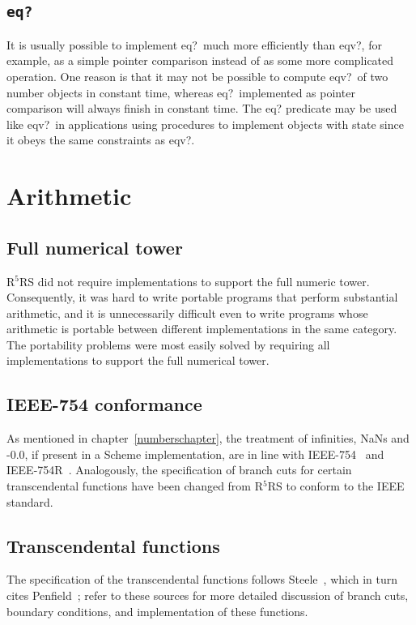 \documentclass[twoside,twocolumn]{algol60}
\newcommand{\rn}[1]{R$^{#1}$RS}
\begin{document}
\subsection{{\tt eq?}}

It is usually possible to implement {\cf eq?}\ much more efficiently
than {\cf eqv?}, for example, as a simple pointer comparison instead
of as some more complicated operation.  One reason is that it may not
be possible to compute {\cf eqv?}\ of two number objects in constant time,
whereas {\cf eq?}\ implemented as pointer comparison will always
finish in constant time.  The {\cf eq?} predicate may be used like
{\cf eqv?}\ in applications using procedures to implement objects with
state since it obeys the same constraints as {\cf eqv?}.

\section{Arithmetic}

\subsection{Full numerical tower}

\rn{5} did not require implementations to support the full numeric
tower.  Consequently, it was hard to write portable programs that
perform substantial arithmetic, and it is unnecessarily difficult even
to write programs whose arithmetic is portable between different
implementations in the same category.  The portability problems were
most easily solved by requiring all implementations to support the
full numerical tower.

\subsection{IEEE-754 conformance}

As mentioned in chapter~\ref{numberschapter}, the treatment of
infinities, NaNs and -0.0, if present in a Scheme implementation, are
in line with IEEE-754~\cite{IEEE} and IEEE-754R~\cite{IEEE754R}.
Analogously, the specification of branch cuts for certain
transcendental functions have been changed from \rn{5} to conform to
the IEEE standard.

\subsection{Transcendental functions}

The specification of the transcendental functions follows
Steele~\cite{CLtL}, which in turn cites Penfield~\cite{Penfield81};
refer to these sources for more detailed discussion of branch cuts,
boundary conditions, and implementation of these functions.
\end{document}
